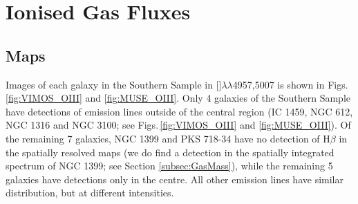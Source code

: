 \section{Ionised Gas Fluxes}
	\label{sec:GasFlux}

	\subsection{Maps}
		\label{subsec:GasMaps}
		Images of each galaxy in the Southern Sample in []$\lambda\lambda$4957,5007 is shown in Figs.\ref{fig:VIMOS_OIII} and \ref{fig:MUSE_OIII}. Only 4 galaxies of the Southern Sample have detections of emission lines outside of the central region (IC 1459, NGC 612, NGC 1316 and NGC 3100; see Figs.\,\ref{fig:VIMOS_OIII} and \ref{fig:MUSE_OIII}). Of the remaining 7 galaxies, NGC 1399 and PKS 718-34 have no detection of H$\beta$ in the spatially resolved maps (we do find a detection in the spatially integrated spectrum of NGC 1399; see Section \ref{subsec:GasMass}), while the remaining 5 galaxies have detections only in the centre. All other emission lines have similar distribution, but at different intensities.%


